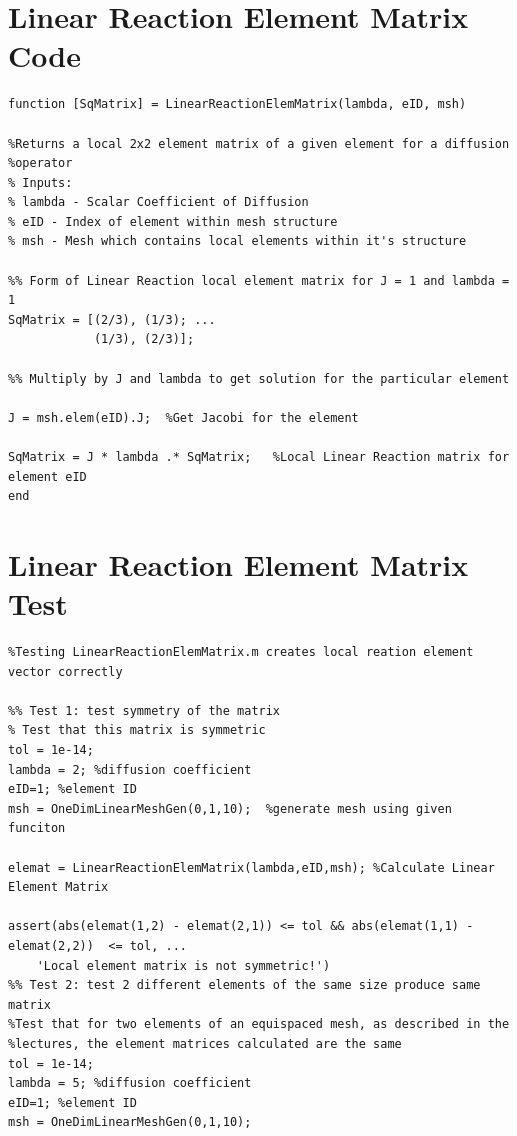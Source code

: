 \documentclass[11pt]{article}
\begin{document}
\begin{appendices}
\section{Linear Reaction Element Matrix Code} \label{ap:React}
\begin{lstlisting}
function [SqMatrix] = LinearReactionElemMatrix(lambda, eID, msh)

%Returns a local 2x2 element matrix of a given element for a diffusion
%operator
% Inputs: 
% lambda - Scalar Coefficient of Diffusion
% eID - Index of element within mesh structure
% msh - Mesh which contains local elements within it's structure

%% Form of Linear Reaction local element matrix for J = 1 and lambda = 1
SqMatrix = [(2/3), (1/3); ...
            (1/3), (2/3)];

%% Multiply by J and lambda to get solution for the particular element

J = msh.elem(eID).J;  %Get Jacobi for the element

SqMatrix = J * lambda .* SqMatrix;   %Local Linear Reaction matrix for element eID
end

\end{lstlisting}

\pagebreak

\section{Linear Reaction Element Matrix Test} \label{ap:ReactTest}
\begin{lstlisting}
%Testing LinearReactionElemMatrix.m creates local reation element vector correctly

%% Test 1: test symmetry of the matrix
% Test that this matrix is symmetric
tol = 1e-14;
lambda = 2; %diffusion coefficient
eID=1; %element ID
msh = OneDimLinearMeshGen(0,1,10);  %generate mesh using given funciton

elemat = LinearReactionElemMatrix(lambda,eID,msh); %Calculate Linear Element Matrix

assert(abs(elemat(1,2) - elemat(2,1)) <= tol && abs(elemat(1,1) - elemat(2,2))  <= tol, ...
    'Local element matrix is not symmetric!')
%% Test 2: test 2 different elements of the same size produce same matrix
%Test that for two elements of an equispaced mesh, as described in the
%lectures, the element matrices calculated are the same
tol = 1e-14;
lambda = 5; %diffusion coefficient
eID=1; %element ID
msh = OneDimLinearMeshGen(0,1,10);


\end{lstlisting}
\end{appendices}
\end{document}

